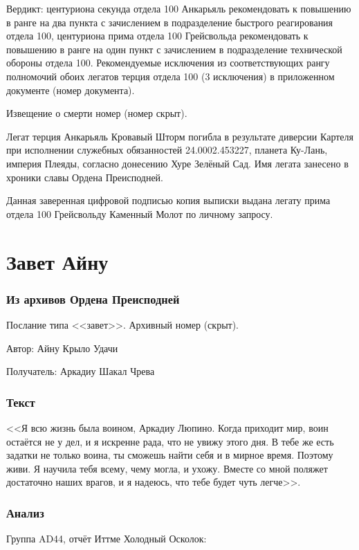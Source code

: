 \documentclass[a4paper,10pt,fleqn]{book}
\begin{document}
Вердикт: центуриона секунда отдела 100 Анкарьяль рекомендовать к повышению в ранге на два пункта с зачислением в подразделение быстрого реагирования отдела 100, центуриона прима отдела 100 Грейсвольда рекомендовать к повышению в ранге на один пункт с зачислением в подразделение технической обороны отдела 100.
Рекомендуемые исключения из соответствующих рангу полномочий обоих легатов терция отдела 100 (3 исключения) в приложенном документе (номер документа).

Извещение о смерти номер (номер скрыт).

Легат терция Анкарьяль Кровавый Шторм погибла в результате диверсии Картеля при исполнении служебных обязанностей 24.0002.453227, планета Ку-Лань, империя Плеяды, согласно донесению Хуре Зелёный Сад.
Имя легата занесено в хроники славы Ордена Преисподней.

Данная заверенная цифровой подписью копия выписки выдана легату прима отдела 100 Грейсвольду Каменный Молот по личному запросу.

\section{Завет Айну}

\subsubsection{Из архивов Ордена Преисподней}

Послание типа <<завет>>. Архивный номер (скрыт).

Автор: Айну Крыло Удачи

Получатель: Аркадиу Шакал Чрева

\subsubsection{Текст}

<<Я всю жизнь была воином, Аркадиу Люпино.
Когда приходит мир, воин остаётся не у дел, и я искренне рада, что не увижу этого дня.
В тебе же есть задатки не только воина, ты сможешь найти себя и в мирное время.
Поэтому живи.
Я научила тебя всему, чему могла, и ухожу.
Вместе со мной поляжет достаточно наших врагов, и я надеюсь, что тебе будет чуть легче>>.

\subsubsection{Анализ}

Группа AD44, отчёт Иттме Холодный Осколок:
\end{document}
